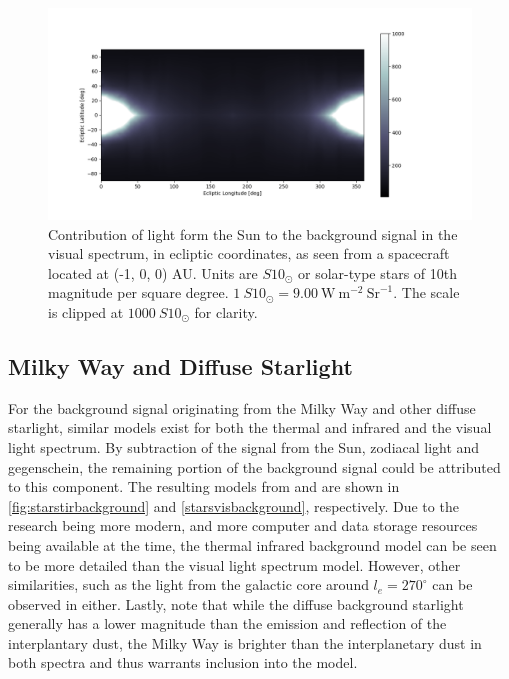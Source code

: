 \begin{figure}[htbp]
 \centering
 \includegraphics[width=1.0\textwidth]{img/background_vis_zodiac.png}
 \caption{Contribution of light form the Sun to the background signal in the visual spectrum, in ecliptic coordinates, as seen from a spacecraft located at (-1, 0, 0) AU. Units are $S10_\odot$ or solar-type stars of 10th magnitude per square degree. $1~S10_\odot = 9.00~\mathrm{W}~\mathrm{m}^{-2}~\mathrm{Sr}^{-1}$. The scale is clipped at $1000 ~S10_\odot$ for clarity.}
 \label{fig:solarvisbackground}
\end{figure}


\subsection{Milky Way and Diffuse Starlight}

For the background signal originating from the Milky Way and other diffuse starlight, similar models exist for both the thermal and infrared and the visual light spectrum. By subtraction of the signal from the Sun, zodiacal light and gegenschein, the remaining portion of the background signal could be attributed to this component. The resulting models from \cite{IRDust} and \cite{LightOfTheNightSky} are shown in \autoref{fig:starstirbackground} and \autoref{starsvisbackground}, respectively. Due to the research being more modern, and more computer and data storage resources being available at the time, the thermal infrared background model can be seen to be more detailed than the visual light spectrum model. However, other similarities, such as the light from the galactic core around $l_e = 270^\circ$ can be observed in either. Lastly, note that while the diffuse background starlight generally has a lower magnitude than the emission and reflection of the interplantary dust, the Milky Way is brighter than the interplanetary dust in both spectra and thus warrants inclusion into the model. \\

